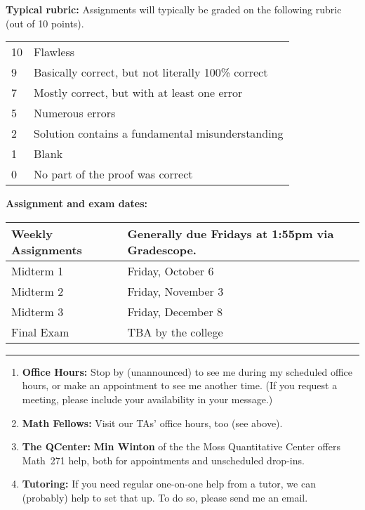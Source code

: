 \documentclass[12pt]{article}
\begin{document}
\vspace*{.15in}
\noindent\textbf{Typical rubric:} 
Assignments will typically be graded on the following rubric (out of 10 points).

\begin{center}
  \begin{tabular}{|l|l|}
    \hline
    10& Flawless\\
    9& Basically correct, but not literally 100\% correct\\
    7& Mostly correct, but with at least one error\\    
    5& Numerous errors\\
    2& Solution contains a fundamental misunderstanding\\
    1& Blank \\    
    0& No part of the proof was correct\\
    \hline
  \end{tabular}
\end{center}


\noindent\textbf{Assignment and exam dates:}

\begin{center}
  \begin{tabular}{|l|l|}
    \hline
    Weekly Assignments & Generally due Fridays at 1:55pm via Gradescope.\\
    \hline
    Midterm 1  & Friday, October 6 \\
    Midterm 2  & Friday, November 3 \\
    Midterm 3  & Friday, December 8 \\             
    Final Exam  & TBA by the college	 \\
    \hline
  \end{tabular}
\end{center}

\smallskip

\hrule
\medskip
{}
\begin{enumerate}
\item[]{\bf Office Hours:}  Stop by (unannounced) to see me during my scheduled office hours, or make an appointment to see me another time. (If you request a meeting, please include your availability in your message.)
\item[] {\bf Math Fellows:} Visit our TAs' office hours, too (see above). 
\item[] {\bf The QCenter:}  \textbf{Min Winton} of the the Moss Quantitative Center offers Math~271 help, both for appointments and unscheduled drop-ins.
\item[] {\bf Tutoring:} If you need regular one-on-one help from a tutor, we can (probably) help to set that up. To do so, please send me an email.
\end{enumerate}
\smallskip
\end{document}
